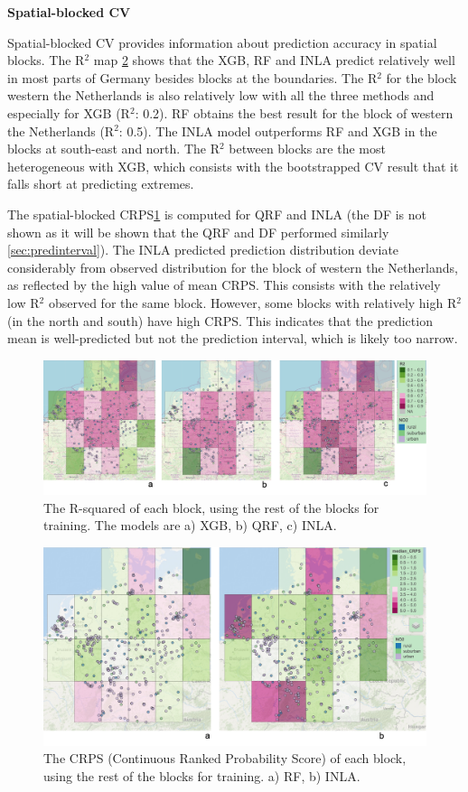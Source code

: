\documentclass{article}
\begin{document}
\textbf{Spatial-blocked CV}

Spatial-blocked CV provides information about prediction accuracy in spatial blocks. The R$^2$ map \cref{fig:r2} shows that the XGB, RF and INLA predict relatively well in most parts of Germany besides blocks at the boundaries. The R$^2$ for the block western the Netherlands is also relatively low with all the three methods and especially for XGB (R$^2$: 0.2). RF obtains the best result for the block of western the Netherlands (R$^2$: 0.5). The INLA model outperforms RF and XGB in the blocks at south-east and north. The R$^2$ between blocks are the most heterogeneous with XGB, which consists with the bootstrapped CV result that it falls short at predicting extremes.  

The spatial-blocked CRPS\cref{fig:crps} is computed for QRF and INLA (the DF is not shown as it will be shown that the QRF and DF performed similarly \cref{sec:predinterval}). The INLA predicted prediction distribution deviate considerably from observed distribution for the block of western the Netherlands, as reflected by the high value of mean CRPS. This consists with the relatively low R$^2$ observed for the same block. However, some blocks with relatively high R$^2$ (in the north and south) have high CRPS. This indicates that the prediction mean is well-predicted but not the prediction interval, which is likely too narrow. 

\begin{figure}
    \centering
    \includegraphics[scale=0.4]{fig/r2spcv.png}
    \caption{The R-squared of each block, using the rest of the blocks for training. The models are a) XGB, b) QRF, c) INLA. 
}
    \label{fig:crps}
\end{figure}

\begin{figure}
    \centering
    \includegraphics[scale=0.3]{fig/crps_RF_INLA.png}
    \caption{The CRPS (Continuous Ranked Probability Score) of each block, using the rest of the blocks for training. a) RF, b) INLA. 
}
    \label{fig:r2}
\end{figure}
\end{document}
